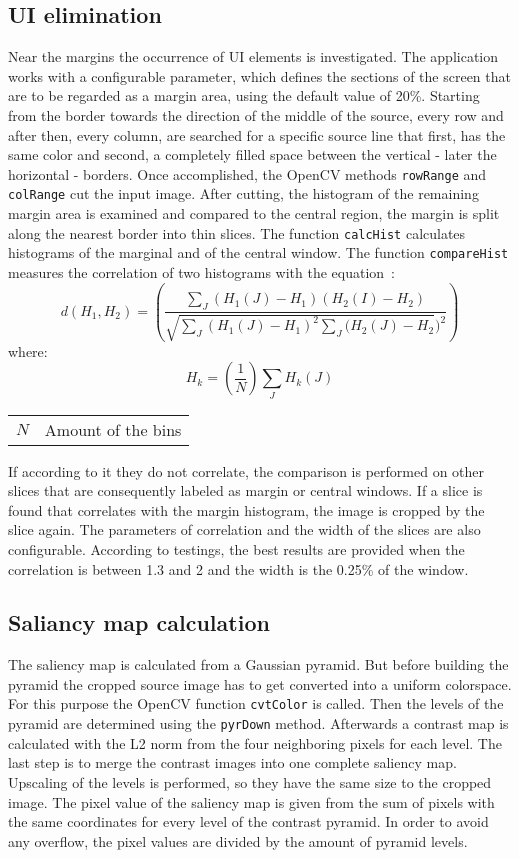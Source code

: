 \documentclass[draft,final]{vutinfth} %
\makeatletter
\newenvironment{conditions}
{\par\vspace{\abovedisplayskip}\noindent\begin{tabular}{>{$}l<{$} @{${}={}$} l}}
	{\end{tabular}\par\vspace{\belowdisplayskip}}
\makeatother
\begin{document}
	\subsection{UI elimination}
	Near the margins the occurrence of UI elements is investigated.
	The application works with a configurable parameter, which defines the sections of the screen that are to be regarded as a margin area, using the default value of 20\%. 
	Starting from the border towards the direction of the middle of the source, every row and after then, every column, are searched for a specific source line that first, has the same color and second, a completely filled space between the vertical - later the horizontal - borders.
	Once accomplished, the OpenCV methods \texttt{rowRange} and \texttt{colRange} cut the input image.
	After cutting, the histogram of the remaining margin area is examined and compared to the central region, the margin is split along the nearest border into thin slices.
	The function \texttt{calcHist} calculates histograms of the marginal and of the central window.
	The function \texttt{compareHist} measures the correlation of two histograms with the equation~\cite{compareHist}:
	\[ d(H_{1},H_{2})=\left(\frac{\sum\limits_{J}(H_{1}(J)-H_{1})(H_{2}(I)-H_{2})}{\sqrt{\sum\limits_{J}(H_{1}(J)-H_{1})^2\sum\limits_{J}(H_{2}(J)-H_{2}})^2}\right) \]
	where:
	\[H_{k}=\left(\frac{1}{N}\right)\sum\limits_{J}H_{k}(J)\]
	\begin{center}
		\begin{conditions}
			N & Amount of the bins 
		\end{conditions}
	\end{center}
	If according to it they do not correlate, the comparison is performed on other slices that are consequently labeled as margin or central windows.
	If a slice is found that correlates with the margin histogram, the image is cropped by the slice again. 
	The parameters of correlation and the width of the slices are also configurable.
	According to testings, the best results are provided when the correlation is between 1.3 and 2 and the width is the 0.25\% of the window.
	
	\subsection{Saliancy map calculation}
	The saliency map is calculated from a Gaussian pyramid.
	But before building the pyramid the cropped source image has to get converted into a uniform colorspace.
	For this purpose the OpenCV function \texttt{cvtColor} is called.
	Then the levels of the pyramid are determined using the \texttt{pyrDown} method.
	Afterwards a contrast map is calculated with the L2 norm from the four neighboring pixels for each level.
	The last step is to merge the contrast images into one complete saliency map.
	Upscaling of the levels is performed, so they have the same size to the cropped image.
	The pixel value of the saliency map is given from the sum of pixels with the same coordinates for every level of the contrast pyramid. 
	In order to avoid any overflow, the pixel values are divided by the amount of pyramid levels.
	
\end{document}
